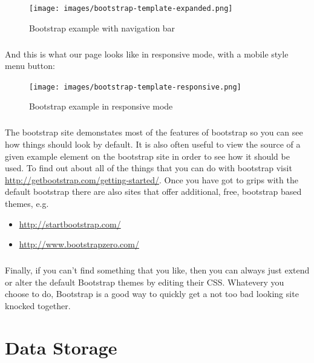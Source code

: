 \documentclass[12pt, a4paper, oneside]{book}
\begin{document}
\begin{figure}[H]
\centering
\texttt{[image: images/bootstrap-template-expanded.png]}
\caption{Bootstrap example with navigation bar}
\label{fig:bootstrap-example-expanded}
\end{figure}

\paragraph{} And this is what our page looks like in responsive mode, with a mobile style menu button:

\begin{figure}[H]
\centering
\texttt{[image: images/bootstrap-template-responsive.png]}
\caption{Bootstrap example in responsive mode}
\label{fig:bootstrap-example-responsive}
\end{figure}


\paragraph{} The bootstrap site demonstates most of the features of bootstrap so you can see how things should look by default. It is also often useful to view the source of a given example element on the bootstrap site in order to see how it should be used. To find out about all of the things that you can do with bootstrap visit \url{http://getbootstrap.com/getting-started/}. Once you have got to grips with the default bootstrap there are also sites that offer additional, free, bootstrap based themes, e.g.

\begin{itemize}
\item \url{http://startbootstrap.com/}
\item \url{http://www.bootstrapzero.com/}
\end{itemize}

\paragraph{} Finally, if you can't find something that you like, then you can always just extend or alter the default Bootstrap themes by editing their CSS. Whatevery you choose to do, Bootstrap is a good way to quickly get a not too bad looking site knocked together.


\chapter{Data Storage}
\label{lab08}
\end{document}
